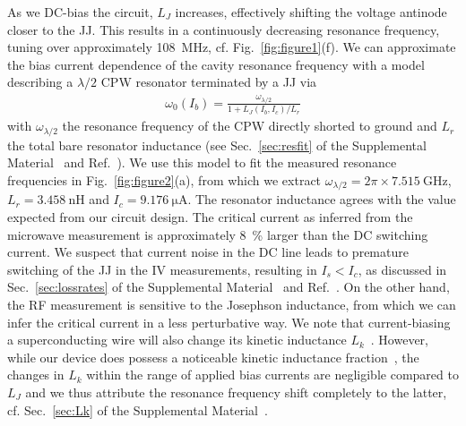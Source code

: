 % 
As we DC-bias the circuit, $L_J$ increases, effectively shifting the voltage antinode closer to the JJ.
% 
This results in a continuously decreasing resonance frequency, tuning over approximately \SI{108}{\mega\hertz}, cf. Fig.~\ref{fig:figure1}(f).
% 
We can approximate the bias current dependence of the cavity resonance frequency with a model describing a $\lambda/2$ CPW resonator terminated by a JJ via
% 
\begin{align}
\omega_0(I_b)=\frac{\omega_{\lambda/2}}{1 + L_J(I_b,I_c)/L_r}
\label{eq:f0vsI}
\end{align}
% 
with $\omega_{\lambda/2}$ the resonance frequency of the CPW directly shorted to ground and $L_r$ the total bare resonator inductance  (see Sec.~\ref{sec:resfit} of the Supplemental Material~\cite{SeeSupplementalMaterial} and Ref.~\cite{pogorzalekHystereticFluxResponse2017}).
% 
We use this model to fit the measured resonance frequencies in Fig.~\ref{fig:figure2}(a), from which we extract $\omega_{\lambda/2}=2\pi\times\SI{7.515}{\giga\hertz}$, $L_r=\SI{3.458}{\nano\henry}$ and $I_c=\SI{9.176}{\micro\ampere}$.
% 
The resonator inductance agrees with the value expected from our circuit design.
% 
The critical current as inferred from the microwave measurement is approximately \SI{8}{\percent} larger than the DC switching current.
% 
We suspect that current noise in the DC line leads to premature switching of the JJ in the IV measurements, resulting in $I_s<I_c$, as discussed in Sec.~\ref{sec:lossrates} of the Supplemental Material~\cite{SeeSupplementalMaterial} and Ref.~\cite{kautzNoiseaffectedIVCurves1990b}.
% 
On the other hand, the RF measurement is sensitive to the Josephson inductance, from which we can infer the critical current in a less perturbative way.
% 
We note that current-biasing a superconducting wire will also change its kinetic inductance $L_k$~\cite{annunziataTunableSuperconductingNanoinductors2010,vissersFrequencytunableSuperconductingResonators2015}.
% 
However, while our device does possess a noticeable kinetic inductance fraction~\cite{gaoExperimentalStudyKinetic2006}, the changes in $L_k$ within the range of applied bias currents are negligible compared to $L_J$ and we thus attribute the resonance frequency shift completely to the latter, cf. Sec.~\ref{sec:Lk} of the Supplemental Material~\cite{SeeSupplementalMaterial}.



